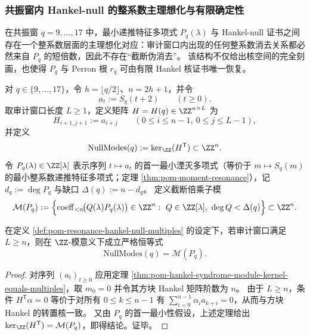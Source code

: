 \subsubsection{共振窗内 Hankel-null 的整系数主理想化与有限确定性}\label{subsubsec:pom-resonance-hankel-null-integral-principalization}
在共振窗 \(q=9,\dots,17\) 中，最小递推特征多项式 \(P_q(\lambda)\) 与 Hankel-null 证书之间存在一个整系数层面的主理想化对应：审计窗口内出现的任何整系数消去关系都必然来自 \(P_q\) 的短倍数，因此不存在“截断伪消去”。
该结构不仅给出核空间的完全刻画，也使得 \(P_q\) 与 Perron 根 \(r_q\) 可由有限 Hankel 核证书唯一恢复。

\begin{definition}\label{def:pom-resonance-hankel-null-multiples}
对 \(q\in\{9,\dots,17\}\)，令 \(h=\lfloor q/2\rfloor\)、\(n=2h+1\)，并令
\[
a_t:=S_q(t+2)\qquad(t\ge 0).
\]
取审计窗口长度 \(L\ge 1\)，定义矩阵 \(H=H(q)\in\ZZ^{n\times L}\) 为
\[
H_{i+1,j+1}:=a_{i+j}\qquad(0\le i\le n-1,\ 0\le j\le L-1),
\]
并定义
\[
\mathrm{NullModes}(q):=\ker_{\ZZ}(H^{\mathsf T})\subset\ZZ^{n}.
\]
令 \(P_q(\lambda)\in\ZZ[\lambda]\) 表示序列 \(t\mapsto a_t\) 的首一最小湮灭多项式（等价于 \(m\mapsto S_q(m)\) 的最小整系数递推特征多项式；定理 \ref{thm:pom-moment-resonance}），记 \(d_q:=\deg P_q\) 与缺口 \(\Delta(q):=n-d_q\)。
定义截断倍乘子模
\[
\mathcal{M}(P_q):=
\Bigl\{\operatorname{coeff}_{<n}\!\bigl(Q(\lambda)P_q(\lambda)\bigr)\in\ZZ^n:\ 
Q\in\ZZ[\lambda],\ \deg Q<\Delta(q)\Bigr\}\subset\ZZ^n.
\]
\end{definition}

\begin{theorem}[共振窗内的整系数主理想化]\label{thm:pom-resonance-hankel-null-integral-principalization}
在定义 \ref{def:pom-resonance-hankel-null-multiples} 的设定下，若审计窗口满足 \(L\ge n\)，则在 \(\ZZ\)-模意义下成立严格恒等式
\[
\boxed{\;\mathrm{NullModes}(q)=\mathcal{M}(P_q).\;}
\]
\end{theorem}
\begin{proof}
对序列 \((a_t)_{t\ge 0}\) 应用定理 \ref{thm:pom-hankel-syndrome-module-kernel-equals-multiples}，取 \(m_0=0\) 并令其方块 Hankel 矩阵阶数为 \(n\)。
由于 \(L\ge n\)，条件 \(H^{\mathsf T}\alpha=0\) 等价于对所有 \(0\le k\le n-1\) 有
\(
\sum_{i=0}^{n-1}\alpha_i a_{k+i}=0
\)，从而与方块 Hankel 的转置核一致。
又由 \(P_q\) 的首一最小性假设，上述定理给出
\(
\ker_{\ZZ}(H^{\mathsf T})=\mathcal{M}(P_q)
\)，即得结论。证毕。
\end{proof}

